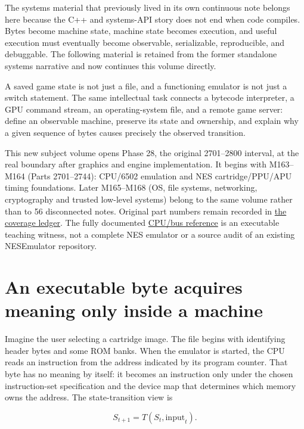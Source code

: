 The systems material that previously lived in its own continuous note belongs here because the C++ and systems-API story does not end when code compiles. Bytes become machine state, machine state becomes execution, and useful execution must eventually become observable, serializable, reproducible, and debuggable. The following material is retained from the former standalone systems narrative and now continues this volume directly.

A saved game state is not just a file, and a functioning emulator is not just a switch statement. The same intellectual task connects a bytecode interpreter, a GPU command stream, an operating-system file, and a remote game server: define an observable machine, preserve its state and ownership, and explain why a given sequence of bytes causes precisely the observed transition.

This new subject volume opens Phase 28, the original 2701--2800 interval, at the real boundary after graphics and engine implementation. It begins with M163--M164 (Parts 2701--2744): CPU/6502 emulation and NES cartridge/PPU/APU timing foundations. Later M165--M168 (OS, file systems, networking, cryptography and trusted low-level systems) belong to the same volume rather than to 56 disconnected notes. Original part numbers remain recorded in \hyperref[appendix-fd090d982a15-phase-28-m163m168-parts-27012800-deterministic-and-trusted-low-level-systems]{the coverage ledger}. The fully documented \hyperref[source-file-552a9e2296dc984412c8f06d]{CPU/bus reference} is an executable teaching witness, not a complete NES emulator or a source audit of an existing NESEmulator repository.

\section{An executable byte acquires meaning only inside a machine}\label{01-foundations-i-ch016-an-executable-byte-acquires-meaning-only-inside-a-machine}

Imagine the user selecting a cartridge image. The file begins with identifying header bytes and some ROM banks. When the emulator is started, the CPU reads an instruction from the address indicated by its program counter. That byte has no meaning by itself: it becomes an instruction only under the chosen instruction-set specification and the device map that determines which memory owns the address. The state-transition view is

\[
S_{t+1}=T(S_t,\mathrm{input}_t).
\]

